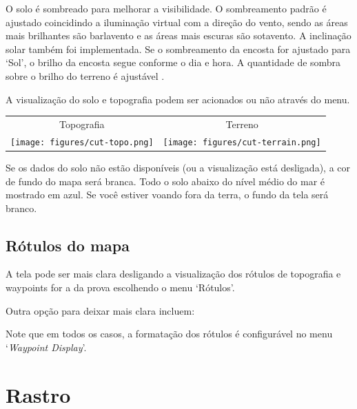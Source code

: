 O solo é sombreado para melhorar a visibilidade.  O sombreamento padrão é ajustado 
coincidindo a iluminação virtual com a direção do vento, sendo as áreas mais brilhantes 
são barlavento e as áreas mais escuras são sotavento.   
A inclinação solar também foi implementada.  Se o sombreamento da encosta for ajustado 
para ‘Sol’, o brilho da encosta segue conforme o dia e hora.  A quantidade de sombra sobre 
o brilho do terreno é ajustável .

A visualização do solo e topografia podem ser acionados ou não através do menu.

\begin{tabular}{c c}
Topografia & Terreno \\
\texttt{[image: figures/cut-topo.png]} &
\texttt{[image: figures/cut-terrain.png]} \\
\end{tabular}

Se os dados do solo não estão disponíveis (ou a visualização está desligada), a cor de fundo do mapa será branca.  Todo o solo abaixo do nível médio do mar é mostrado em azul.  Se você estiver voando fora da terra, o fundo da tela será branco.  

\subsection*{Rótulos do mapa}\label{sec:maplabels}

A tela pode ser mais clara desligando a visualização dos rótulos de topografia e waypoints for a da prova escolhendo o menu ‘Rótulos’.

Outra opção para deixar mais clara incluem:



Note que em todos os casos, a formatação dos rótulos é configurável no menu
`{\it Waypoint Display}'.  


\section{Rastro}\label{sec:trail}


